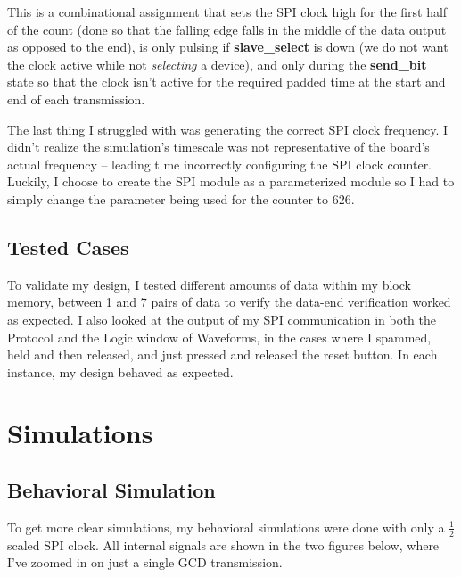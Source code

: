 \documentclass[a4paper, 12pt]{article}
\begin{document}
This is a combinational assignment that sets the SPI clock high for the first half of the count (done so that the falling edge falls in the middle of the data output as opposed to the end), is only pulsing if \textbf{slave\_select} is down (we do not want the clock active while not \textit{selecting} a device), and only during the \textbf{send\_bit} state so that the clock isn't active for the required padded time at the start and end of each transmission.

The last thing I struggled with was generating the correct SPI clock frequency. I didn't realize the simulation's timescale was not representative of the board's actual frequency -- leading t me incorrectly configuring the SPI clock counter. Luckily, I choose to create the SPI module as a parameterized module so I had to simply change the parameter being used for the counter to 626.

\subsection{Tested Cases}
To validate my design, I tested different amounts of data within my block memory, between 1 and 7 pairs of data to verify the data-end verification worked as expected. I also looked at the output of my SPI communication in both the Protocol and the Logic window of Waveforms, in the cases where I spammed, held and then released, and just pressed and released the reset button. In each instance, my design behaved as expected.

\section{Simulations}
\subsection{Behavioral Simulation}
To get more clear simulations, my behavioral simulations were done with only a $\frac{1}{2}$ scaled SPI clock. All internal signals are shown in the two figures below, where I've zoomed in on just a single GCD transmission.
\end{document}
